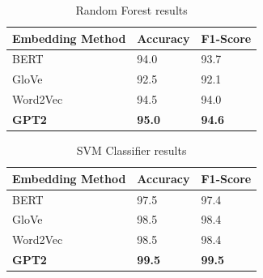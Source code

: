 \begin{table}[hbt!]
\begin{threeparttable}
\caption{Random Forest results}
\label{rf_results}
\begin{tabular}{lll}
\toprule
\headrow Embedding Method & Accuracy & F1-Score\\
\midrule
 BERT     &       94.0 &       93.7 \\
 GloVe    &       92.5 &       92.1 \\
 Word2Vec &       94.5 &       94.0 \\
 \textbf{GPT2}     &       \textbf{95.0}   &       \textbf{94.6} \\
\bottomrule
\end{tabular}
\end{threeparttable}
\end{table}

\begin{table}[hbt!]
\begin{threeparttable}
\caption{SVM Classifier results}
\label{svc_results}
\begin{tabular}{lll}
\toprule
\headrow Embedding Method & Accuracy & F1-Score\\
\midrule
 BERT     &       97.5 &       97.4 \\
 GloVe    &       98.5 &       98.4 \\
 Word2Vec &       98.5 &       98.4 \\
 \textbf{GPT2}     &       \textbf{99.5} &       \textbf{99.5} \\
\bottomrule
\end{tabular}
\end{threeparttable}
\end{table}

